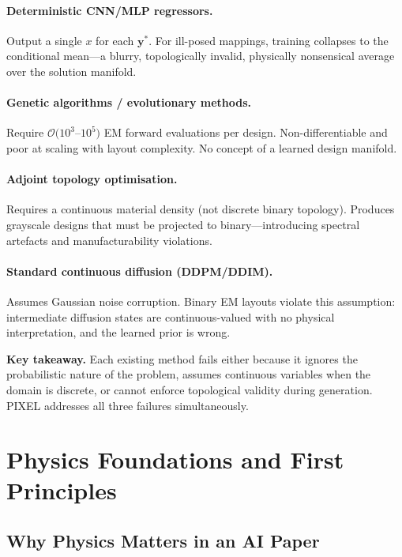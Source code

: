 \documentclass[12pt,a4paper]{article}
\newcommand{\ystar}{\mathbf{y}^{*}}
\newcommand{\NOTE}[1]{\begin{tcolorbox}[notebox]#1\end{tcolorbox}}
\theoremstyle{definition}
\theoremstyle{plain}
\theoremstyle{remark}
\begin{document}
\paragraph{Deterministic CNN/MLP regressors.}
Output a single $x$ for each $\ystar$.
For ill-posed mappings, training collapses to the conditional mean—a blurry,
topologically invalid, physically nonsensical average over the solution manifold.

\paragraph{Genetic algorithms / evolutionary methods.}
Require $\mathcal{O}(10^3$--$10^5)$ EM forward evaluations per design.
Non-differentiable and poor at scaling with layout complexity.
No concept of a learned design manifold.

\paragraph{Adjoint topology optimisation.}
Requires a continuous material density (not discrete binary topology).
Produces grayscale designs that must be projected to binary—introducing spectral
artefacts and manufacturability violations.

\paragraph{Standard continuous diffusion (DDPM/DDIM).}
Assumes Gaussian noise corruption.
Binary EM layouts violate this assumption: intermediate diffusion states are
continuous-valued with no physical interpretation, and the learned prior is wrong.

\NOTE{\textbf{Key takeaway.}
Each existing method fails either because it ignores the probabilistic nature of the
problem, assumes continuous variables when the domain is discrete, or cannot enforce
topological validity during generation.
PIXEL addresses all three failures simultaneously.}

\section{Physics Foundations and First Principles}
\label{sec:physics}

\subsection{Why Physics Matters in an AI Paper}
\end{document}
